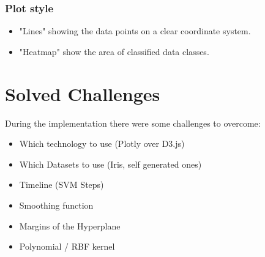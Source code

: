 \documentclass{scrartcl}
\begin{document}

\subsubsection*{Plot style}
\begin{itemize}
	\item "Lines" showing the data points on a clear coordinate system.
	\item "Heatmap" show the area of classified data classes.
\end{itemize}








\section{Solved Challenges}

During the implementation there were some challenges to overcome:

\begin{itemize}
	\item Which technology to use (Plotly over D3.js)
	\item Which Datasets to use (Iris, self generated ones)
	\item Timeline (SVM Steps) 
	\item Smoothing function
	\item Margins of the Hyperplane
	\item Polynomial / RBF kernel 
\end{itemize}
\end{document}
